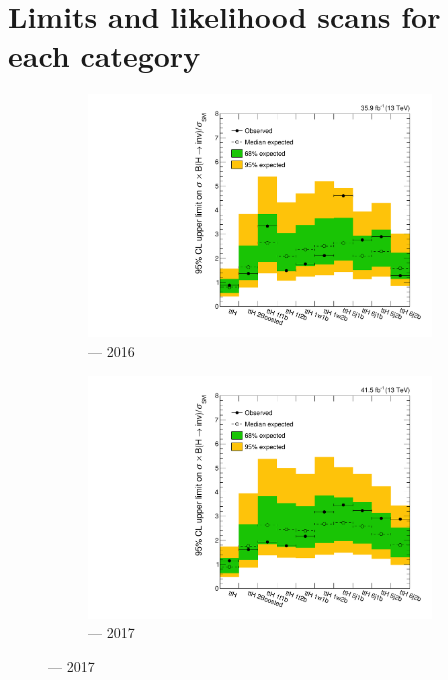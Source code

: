 \clearpage




\section{Limits and likelihood scans for each category}
\label{sec:limits_likelihoods_cats_supplementary}

\begin{figure}[htbp]
    \centering
    \begin{subfigure}[b]{0.49\textwidth}
        \includegraphics[width=\textwidth]{chapters/higgstoinv/figures/limits/ttH/limit_2016_ttH.pdf}
        \caption{\ttH --- 2016}
    \end{subfigure}
    \hfill
    \begin{subfigure}[b]{0.49\textwidth}
        \includegraphics[width=\textwidth]{chapters/higgstoinv/figures/limits/ttH/limit_2017_ttH.pdf}
        \caption{\ttH --- 2017}
    \end{subfigure}


\end{figure}

